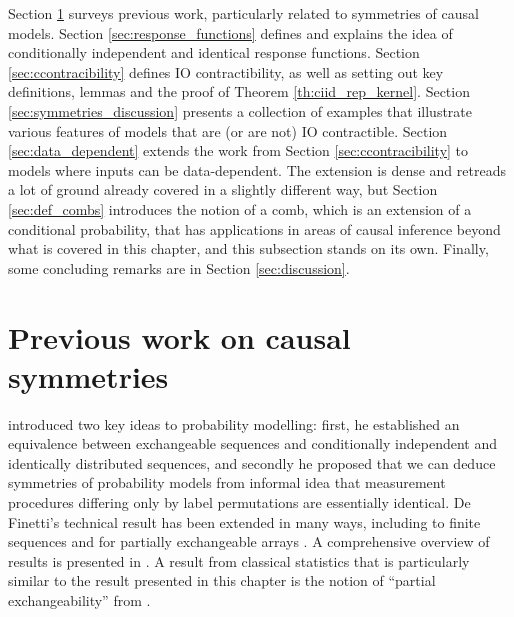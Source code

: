 Section \ref{sec:prev_work} surveys previous work, particularly related to symmetries of causal models. Section \ref{sec:response_functions} defines and explains the idea of conditionally independent and identical response functions. Section \ref{sec:ccontracibility} defines IO contractibility, as well as setting out key definitions, lemmas and the proof of Theorem \ref{th:ciid_rep_kernel}. Section \ref{sec:symmetries_discussion} presents a collection of examples that illustrate various features of models that are (or are not) IO contractible. Section \ref{sec:data_dependent} extends the work from Section \ref{sec:ccontracibility} to models where inputs can be data-dependent. The extension is dense and retreads a lot of ground already covered in a slightly different way, but Section \ref{sec:def_combs} introduces the notion of a comb, which is an extension of a conditional probability, that has applications in areas of causal inference beyond what is covered in this chapter, and this subsection stands on its own. Finally, some concluding remarks are in Section \ref{sec:discussion}.


\section{Previous work on causal symmetries}\label{sec:prev_work}

\cite{de_finetti_foresight_1992} introduced two key ideas to probability modelling: first, he established an equivalence between exchangeable sequences and conditionally independent and identically distributed sequences, and secondly he proposed that we can deduce symmetries of probability models from informal idea that measurement procedures differing only by label permutations are essentially identical. De Finetti's technical result has been extended in many ways, including to finite sequences \citet{kerns_definettis_2006,diaconis_finite_1980} and for partially exchangeable arrays \citet{aldous_representations_1981}. A comprehensive overview of results is presented in \citet{kallenberg_probabilistic_2005}. A result from classical statistics that is particularly similar to the result presented in this chapter is the notion of ``partial exchangeability'' from \citet{diaconis_recent_1988}.

